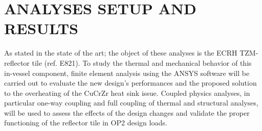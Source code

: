 \chapter{ANALYSES SETUP AND RESULTS}
\normalsize{As stated in the state of the art; the object of these analyses is the \acrshort{ECRH} TZM-reflector tile (ref. E821). To study the thermal and mechanical behavior of this in-vessel component, finite element analysis using the ANSYS\textsuperscript{\textregistered} software will be carried out to evaluate the new design's performances and the proposed solution to the overheating of the CuCrZr heat sink issue. Coupled physics analyses, in particular one-way coupling and full coupling of thermal and structural analyses, will be used to assess the effects of the design changes and validate the proper functioning of the reflector tile in \acrshort{OP2} design loads.}




